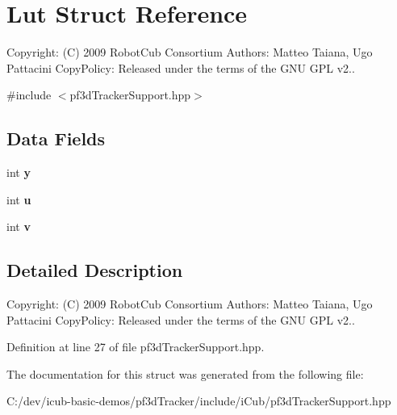 \section{Lut Struct Reference}
\label{structLut}


Copyright\+: (C) 2009 Robot\+Cub Consortium Authors\+: Matteo Taiana, Ugo Pattacini Copy\+Policy\+: Released under the terms of the G\+NU G\+PL v2..  




{\ttfamily \#include $<$pf3d\+Tracker\+Support.\+hpp$>$}

\subsection*{Data Fields}
\begin{DoxyCompactItemize}
\item 
int {\bfseries y}\label{structLut_a02ec6461b84d3375c306c383481c00f2}

\item 
int {\bfseries u}\label{structLut_a0ce7d6fb23e6c8cc9eb5935cc6a39d87}

\item 
int {\bfseries v}\label{structLut_ae111fc109ad126980bd30ad3b87d4720}

\end{DoxyCompactItemize}


\subsection{Detailed Description}
Copyright\+: (C) 2009 Robot\+Cub Consortium Authors\+: Matteo Taiana, Ugo Pattacini Copy\+Policy\+: Released under the terms of the G\+NU G\+PL v2.. 

Definition at line 27 of file pf3d\+Tracker\+Support.\+hpp.



The documentation for this struct was generated from the following file\+:\begin{DoxyCompactItemize}
\item 
C\+:/dev/icub-\/basic-\/demos/pf3d\+Tracker/include/i\+Cub/pf3d\+Tracker\+Support.\+hpp\end{DoxyCompactItemize}
